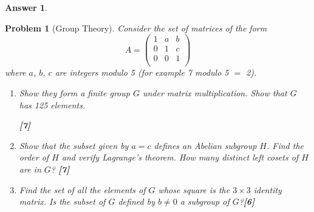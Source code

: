 \documentclass[a4paper]{article}
\newtheorem{ans}{Answer}[section]
\theoremstyle{new}
\newtheorem{qns}{Problem}[section]
\begin{document}
\begin{ans}
\begin{enumerate}[label=(\alph*)]
\end{enumerate}
\end{ans}
\newpage
\begin{qns}[Group Theory]
Consider the set of matrices of the form
$$A=\begin{pmatrix}1&a&b\\0&1&c\\0&0&1\\\end{pmatrix}$$
where $a$, $b$, $c$ are integers modulo 5 (for example 7 modulo 5 $=$ 2).
\begin{enumerate}[label=(\alph*)]
\item Show they form a finite group $G$ under matrix multiplication. Show that $G$ has 125 elements.

\hfill\textbf{[7]}
\item Show that the subset given by $a = c$ defines an Abelian subgroup $H$. Find the order of $H$ and verify Lagrange’s theorem. How many distinct left cosets of $H$ are in $G$?
\hfill\textbf{[7]}
\item Find the set of all the elements of $G$ whose square is the $3\times 3$ identity matrix. Is the subset of $G$ defined by $b\neq 0$ a subgroup of $G$?\hfill\textbf{[6]}
\end{enumerate}
\end{qns}
\end{document}
